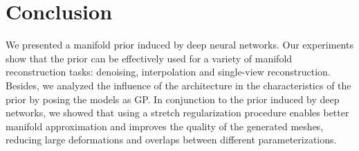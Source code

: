 \section{Conclusion}

We presented a manifold prior induced by deep neural networks.
Our experiments show that the prior can be effectively used for a variety of manifold reconstruction
tasks: denoising, interpolation and single-view reconstruction.
Besides, we analyzed the influence of the architecture in the characteristics of the prior
by posing the models as GP.
In conjunction to the prior induced by deep networks, we showed that using a stretch regularization procedure enables
better manifold approximation and improves the quality of the generated meshes, reducing large deformations and overlaps
between different parameterizations.



